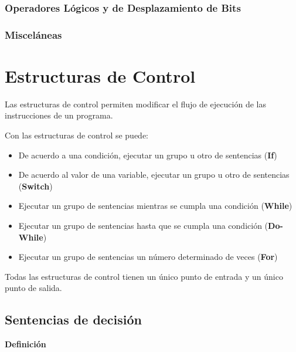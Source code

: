 \subsubsection{Operadores Lógicos y de Desplazamiento de Bits}

\subsubsection{Misceláneas}







\section{Estructuras de Control}

Las estructuras de control permiten modificar el flujo de ejecución de las instrucciones de un programa.

Con las estructuras de control se puede:

\begin{itemize}
\item De acuerdo a una condición, ejecutar un grupo u otro de sentencias (\textbf{If})
\item De acuerdo al valor de una variable, ejecutar un grupo u otro de sentencias (\textbf{Switch})
\item Ejecutar un grupo de sentencias mientras se cumpla una condición (\textbf{While})
\item Ejecutar un grupo de sentencias hasta que se cumpla una condición (\textbf{Do-While})
\item Ejecutar un grupo de sentencias un número determinado de veces (\textbf{For})
\end{itemize}

Todas las estructuras de control tienen un único punto de entrada y un único punto de salida.


\subsection{Sentencias de decisión}

\begin{center}
	\textbf{Definición}
\end{center}

